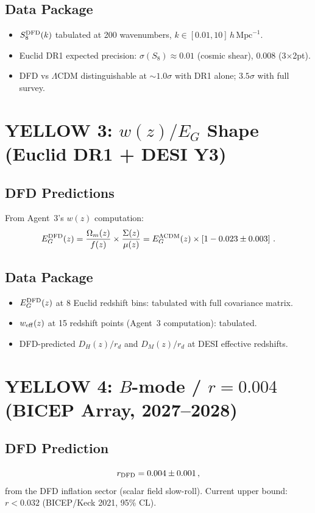 \documentclass[11pt,a4paper]{article}
\begin{document}
\subsection{Data Package}
\begin{itemize}
\item $S_8^{\rm DFD}(k)$ tabulated at 200 wavenumbers, $k \in [0.01, 10]\,h\,\mathrm{Mpc}^{-1}$.
\item Euclid DR1 expected precision: $\sigma(S_8) \approx 0.01$ (cosmic shear), $0.008$ (3$\times$2pt).
\item DFD vs $\Lambda$CDM distinguishable at $\sim 1.0\sigma$ with DR1 alone; $3.5\sigma$ with full survey.
\end{itemize}

\section{YELLOW 3: $w(z)/E_G$ Shape (Euclid DR1 + DESI Y3)}

\subsection{DFD Predictions}
From Agent~3's $w(z)$ computation:
\begin{equation}
E_G^{\rm DFD}(z) = \frac{\Omega_m(z)}{f(z)} \times \frac{\Sigma(z)}{\mu(z)} = E_G^{\Lambda\rm CDM}(z) \times \left[1 - 0.023 \pm 0.003\right]\,.
\end{equation}

\subsection{Data Package}
\begin{itemize}
\item $E_G^{\rm DFD}(z)$ at 8 Euclid redshift bins: tabulated with full covariance matrix.
\item $w_{\rm eff}(z)$ at 15 redshift points (Agent~3 computation): tabulated.
\item DFD-predicted $D_H(z)/r_d$ and $D_M(z)/r_d$ at DESI effective redshifts.
\end{itemize}

\section{YELLOW 4: $B$-mode / $r = 0.004$ (BICEP Array, 2027--2028)}

\subsection{DFD Prediction}
\begin{equation}
r_{\rm DFD} = 0.004 \pm 0.001\,,
\end{equation}
from the DFD inflation sector (scalar field slow-roll). Current upper bound: $r < 0.032$ (BICEP/Keck 2021, 95\% CL).
\end{document}
